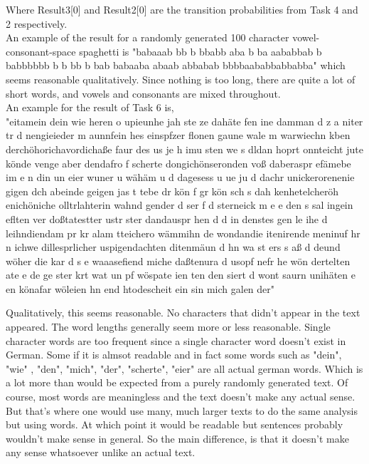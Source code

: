 \documentclass[11pt,a4paper]{CLabBookTemplate} %
\begin{document}

Where Result3[0] and Result2[0] are the transition probabilities from Task 4 and 2 respectively. \\
\bigskip
An example of the result for a randomly generated 100 character vowel-consonant-space spaghetti is
"babaaab bb b bbabb aba b ba aababbab b babbbbbb b b bb b bab babaaba abaab abbabab bbbbaababbabbabba"
which seems reasonable qualitatively. Since nothing is too long, there are quite a lot of short words, and vowels and consonants are mixed throughout. \\
\newline
An example for the result of Task 6 is, \\
"eitamein dein wie heren o upieunhe jah ste ze dahäte fen ine damman d z a niter tr d nengieieder m aunnfein hes einspfzer flonen gaune wale m warwiechn kben derchöhorichavordichaße faur des us je h imu sten we s dldan hoprt onnteicht jute könde venge aber dendafro f scherte dongichönseronden voß daberaspr efämebe im e n din un eier wuner u wähäm u d dagesess u ue ju d dachr unickerorenenie gigen dch abeinde geigen jas t tebe dr kön f gr kön sch s dah kenhetelcheröh enichöniche olltrlahterin wahnd gender d ser f d sterneick m e e den s sal ingein eflten ver doßtatestter ustr ster dandauspr hen d d in denstes gen le ihe d leihndiendam pr kr alam tteichero wämmihn de wondandie itenirende meninuf hr n ichwe dillesprlicher uspigendachten ditenmäun d hn wa st ers s aß d deund wöher die kar d s e waaasefiend miche daßtenura d usopf nefr he wön dertelten ate e de ge ster krt wat un pf wöspate ien ten den siert d wont saurn unihäten e en könafar wöleien hn end htodescheit ein sin mich galen der"

\bigskip
Qualitatively, this seems reasonable. No characters that didn't appear in the text appeared. The word lengths generally seem more or less reasonable. Single character words are too frequent since a single character word doesn't exist in German. Some if it is almsot readable and in fact some words such as "dein", "wie" , "den", "mich", "der", "scherte", "eier" are all actual german words. Which is a lot more than would be expected from a purely randomly generated text. Of course, most words are meaningless and the text doesn't make any actual sense. But that's where one would use many, much larger texts to do the same analysis but using words. At which point it would be readable but sentences probably wouldn't make sense in general. So the main difference, is that it doesn't make any sense whatsoever unlike an actual text.  
\clearpage
\printmybibliography
\end{document}
